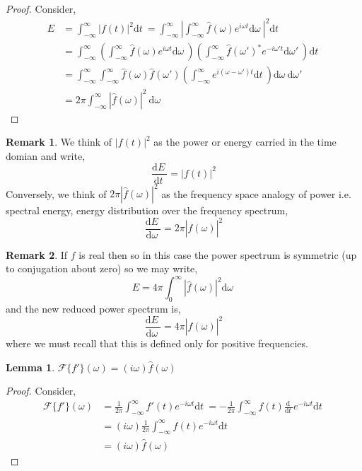 \documentclass[12pt]{extarticle}
\renewcommand{\d}[1]{ \mathrm{d}#1 \:}
\newcommand{\deriv}[2]{\frac{\d{#1}}{\d{#2}}}
\theoremstyle{definition}
\newtheorem{lemma}[theorem]{Lemma}
\newtheorem{remark}{Remark}
\newcommand{\F}{\mathcal{F}}
\begin{document}
\begin{proof}
Consider,
\begin{align*}
E & = \int_{-\infty}^\infty |f(t)|^2 \d{t} = \int_{-\infty}^\infty \left| \int^{\infty}_{-\infty} \hat{f}(\omega) e^{i \omega t} \d{\omega}\right|^2 \d{t}
\\
& = \int_{-\infty}^\infty \left( \int^{\infty}_{-\infty} \hat{f}(\omega) e^{i \omega t} \d{\omega} \right) \left( \int^{\infty}_{-\infty} \hat{f}(\omega')^* e^{-i \omega' t} \d{\omega'} \right) \d{t}
\\
& = \int_{-\infty}^\infty \int_{-\infty}^\infty  \hat{f}(\omega) \hat{f}(\omega') \left( \int_{-\infty}^\infty e^{i (\omega - \omega') t} \d{t} \right) \d{\omega} \d{\omega'}
\\
& = 2\pi \int_{-\infty}^\infty |\hat{f}(\omega)|^2 \: \d{\omega}
\end{align*}
\end{proof}

\begin{remark}
We think of $|f(t)|^2$ as the power or energy carried in the time domian and write,
\[ \deriv{E}{t} = |f(t)|^2 \]
Conversely, we think of $2 \pi |\hat{f}(\omega)|^2$ as the frequency space analogy of power i.e. spectral energy, energy distribution over the frequency spectrum,
\[ \deriv{E}{\omega} = 2 \pi |\hat{f}(\omega)|^2 \]
\end{remark}

\begin{remark}
If $f$ is real then so in this case the power spectrum is symmetric (up to conjugation about zero) so we may write,
\[ E = 4 \pi \int_0^\infty  | \hat{f}(\omega) |^2 \d{\omega} \]
and the new reduced power spectrum is,
\[ \deriv{E}{\omega} = 4 \pi | \hat{f}(\omega) |^2 \]
where we must recall that this is defined only for positive frequencies. 
\end{remark}

\begin{lemma}
$\F \{ f' \}(\omega) = (i \omega) \hat{f}(\omega)$
\end{lemma}

\begin{proof}
Consider,
\begin{align*}
\F \{ f' \}(\omega) & = \frac{1}{2 \pi} \int_{-\infty}^\infty f'(t) e^{-i \omega t} \d{t} = - \frac{1}{2 \pi} \int_{-\infty}^\infty f(t)  \deriv{}{t} e^{-i \omega t} \d{t}
\\
& = (i \omega) \frac{1}{2 \pi} \int_{-\infty}^\infty f(t) e^{-i \omega t} \d{t}
\\
& = (i \omega) \hat{f}(\omega)
\end{align*}
\end{proof}
\end{document}
